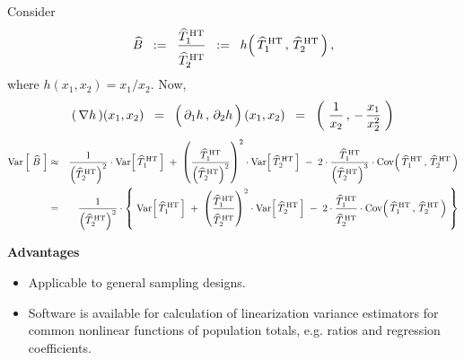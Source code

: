 \begin{example}
\mbox{}\vskip 0.2cm
\noindent
Consider
\begin{equation*}
\widehat{B}
\;\; := \;\;
	\dfrac{
	\widehat{T}^{\,\textnormal{HT}}_{1}
	}{
	\overset{{\color{white}.}}{\widehat{T}^{\,\textnormal{HT}}_{2}}
	}
\;\; := \;\;
	h\!\left(\,\widehat{T}^{\,\textnormal{HT}}_{1}\,,\,\widehat{T}^{\,\textnormal{HT}}_{2}\,\right),
\end{equation*}
where $h(x_{1},x_{2}) = x_{1} / x_{2}$.
Now,
\begin{equation*}
(\,\nabla h\,)(x_{1},x_{2})
\;\; = \;\;
	\left(\,\overset{{\color{white}.}}{\partial_{1}h}\,,\,\partial_{2}h\,\right)(x_{1},x_{2})
\;\; = \;\;
	\left(\;\dfrac{1}{x_{2}}\,,\,-\,\dfrac{x_{1}}{x_{2}^{2}}\;\right)
\end{equation*}
\begin{eqnarray*}
\Var\left[\;\widehat{B}\;\right]
&\approx&
	\dfrac{1}{\left(\widehat{T}^{\,\textnormal{HT}}_{2}\right)^{2}}
		\cdot
		\Var\!\left[\,\widehat{T}^{\,\textnormal{HT}}_{1}\,\right]
	\; + \;
	\left(\dfrac{\widehat{T}^{\,\textnormal{HT}}_{1}}{\left(\widehat{T}^{\,\textnormal{HT}}_{2}\right)^{2}}\right)^{2}
		\cdot
		\Var\!\left[\,\widehat{T}^{\,\textnormal{HT}}_{2}\,\right]
	\; - \;
		2 \cdot
		\dfrac{\widehat{T}^{\,\textnormal{HT}}_{1}}{\left(\widehat{T}^{\,\textnormal{HT}}_{2}\right)^{3}}
		\cdot
		\Cov\!\left(\,\widehat{T}^{\,\textnormal{HT}}_{1}\,,\,\widehat{T}^{\,\textnormal{HT}}_{2}\,\right)
\\
&=&
	\dfrac{1}{\left(\widehat{T}^{\,\textnormal{HT}}_{2}\right)^{2}}
	\cdot
	\left\{\;
		\Var\!\left[\,\widehat{T}^{\,\textnormal{HT}}_{1}\,\right]
		\; + \;
		\left(
			\dfrac{\widehat{T}^{\,\textnormal{HT}}_{1}
			}{
			\overset{{\color{white}.}}{\widehat{T}^{\,\textnormal{HT}}_{2}}
			}
			\right)^{2}
			\cdot
			\Var\!\left[\,\widehat{T}^{\,\textnormal{HT}}_{2}\,\right]
		\; - \;
			2 \cdot
			\dfrac{\widehat{T}^{\,\textnormal{HT}}_{1}}{\overset{{\color{white}.}}{\widehat{T}^{\,\textnormal{HT}}_{2}}}
			\cdot
			\Cov\!\left(\,\widehat{T}^{\,\textnormal{HT}}_{1}\,,\,\widehat{T}^{\,\textnormal{HT}}_{2}\,\right)
		\;\right\}
\end{eqnarray*}
\end{example}

\vskip 0.5cm
\noindent
\textbf{Advantages}
\begin{itemize}
\item
	Applicable to general sampling designs.
\item
	Software is available for calculation of linearization variance estimators
	for common nonlinear functions of population totals,
	e.g. ratios and regression coefficients.
\end{itemize}

